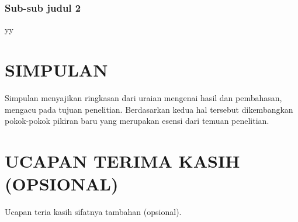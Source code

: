\documentclass{iaesarticle-progres}
\begin{document}
\subsubsection {Sub-sub judul 2}
yy

\section{SIMPULAN}
\label{simpulan}
Simpulan menyajikan ringkasan dari uraian mengenai hasil dan pembahasan, mengacu pada tujuan penelitian. Berdasarkan kedua hal tersebut dikembangkan pokok-pokok pikiran baru yang merupakan esensi dari temuan penelitian.

\section*{UCAPAN TERIMA KASIH (OPSIONAL)}
\label{acknowledgement}
Ucapan teria kasih sifatnya tambahan (opsional).





\printbibliography[title={DAFTAR PUSTAKA}]
%
%
%


\end{document}
